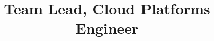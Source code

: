 \documentclass[11pt,a4paper,sans]{moderncv}                 %
\title{Team Lead, Cloud Platforms Engineer}
\begin{document}
\makecvtitle


\end{document}
